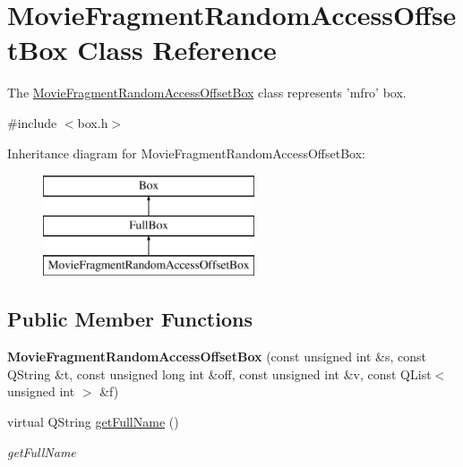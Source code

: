 \hypertarget{class_movie_fragment_random_access_offset_box}{\section{Movie\-Fragment\-Random\-Access\-Offset\-Box Class Reference}
\label{class_movie_fragment_random_access_offset_box}
}


The \hyperlink{class_movie_fragment_random_access_offset_box}{Movie\-Fragment\-Random\-Access\-Offset\-Box} class represents 'mfro' box.  




{\ttfamily \#include $<$box.\-h$>$}

Inheritance diagram for Movie\-Fragment\-Random\-Access\-Offset\-Box\-:\begin{figure}[H]
\begin{center}
\leavevmode
\includegraphics[height=3.000000cm]{class_movie_fragment_random_access_offset_box}
\end{center}
\end{figure}
\subsection*{Public Member Functions}
\begin{DoxyCompactItemize}
\item 
\hypertarget{class_movie_fragment_random_access_offset_box_a8e88a290e7c0b235c4eda4480f1995c8}{{\bfseries Movie\-Fragment\-Random\-Access\-Offset\-Box} (const unsigned int \&s, const Q\-String \&t, const unsigned long int \&off, const unsigned int \&v, const Q\-List$<$ unsigned int $>$ \&f)}\label{class_movie_fragment_random_access_offset_box_a8e88a290e7c0b235c4eda4480f1995c8}

\item 
virtual Q\-String \hyperlink{class_movie_fragment_random_access_offset_box_af4d75bd89f37a3e2de59d4e327924dff}{get\-Full\-Name} ()
\begin{DoxyCompactList}\small\item\em get\-Full\-Name \end{DoxyCompactList}\end{DoxyCompactItemize}
